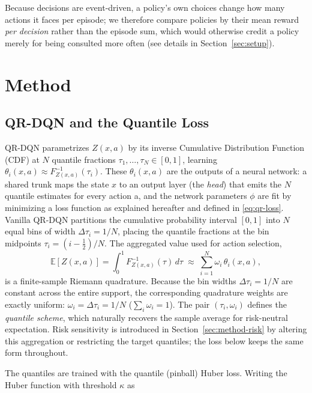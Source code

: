 \documentclass{ieeetmlcn}
\begin{document}
Because decisions are event-driven, a policy's own choices change how many actions it
faces per episode; we therefore compare policies by their mean reward
\emph{per decision} rather than the episode sum, which would otherwise credit a
policy merely for being consulted more often (see details in Section~\ref{sec:setup}).


\section{Method}
\label{sec:method}

\subsection{QR-DQN and the Quantile Loss}
QR-DQN parametrizes $Z(x,a)$ by its inverse Cumulative Distribution Function (CDF) at $N$ quantile fractions
$\tau_1,\dots,\tau_N\in[0,1]$, learning
$\theta_i(x,a)\approx F^{-1}_{Z(x,a)}(\tau_i)$.
These $\theta_i(x,a)$ are the
outputs of a neural network: a shared trunk maps the state $x$ to an output
layer (the \emph{head}) that emits the $N$ quantile estimates for every action
a, and the network parameters $\phi$ are fit by
minimizing a loss function as explained hereafter and defined in \eqref{eq:qr-loss}.
Vanilla QR-DQN partitions the cumulative probability interval $[0,1]$ into $N$ equal bins of width $\Delta \tau_i = 1/N$, placing the quantile fractions at the bin midpoints $\tau_i=(i-\tfrac12)/N$. The aggregated value used for action selection,
\begin{equation}
\mathbb{E}[Z(x,a)] = \int_0^1 F^{-1}_{Z(x,a)}(\tau)\,d\tau
\;\approx\; \sum_{i=1}^{N} \omega_i\,\theta_i(x,a),
\label{eq:expectation}
\end{equation}
is a finite-sample Riemann quadrature. Because the bin widths $\Delta \tau_i = 1/N$ are constant across the entire support, the corresponding quadrature weights are exactly uniform: $\omega_i = \Delta \tau_i = 1/N$ ($\sum_i \omega_i = 1$). The pair $(\tau_i,\omega_i)$ defines the \emph{quantile scheme}, which naturally recovers the sample average for risk-neutral expectation. Risk sensitivity is introduced in Section~\ref{sec:method-risk} by altering this aggregation or restricting the target quantiles; the loss below keeps the same form throughout.

The quantiles are trained with the quantile (pinball) Huber loss. Writing the
Huber function with threshold $\kappa$ as
\end{document}
